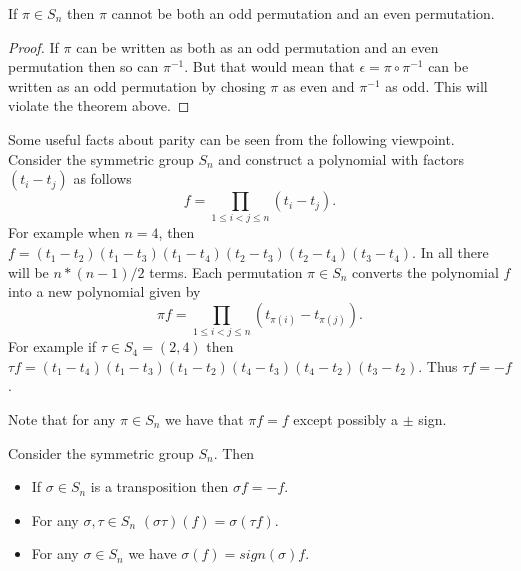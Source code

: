 \begin{Theorem}
    If $\pi \in S_n$ then $\pi$ cannot be both an odd permutation and an even permutation.
\end{Theorem}
\begin{proof}
    If $\pi$ can be written as both as an odd permutation and an even permutation then so can
    $\pi^{-1}$. But that would mean that $\epsilon = \pi \circ \pi ^{-1}$ can be written as an odd
    permutation by chosing $\pi$ as even and $\pi^{-1}$ as odd. This will violate the theorem above.
\end{proof}

Some useful facts about parity can be seen from the following viewpoint. Consider the symmetric
group $S_n$ and construct a polynomial with factors $(t_i - t_j)$ as follows 
\begin{equation*}
    f = \prod_{1 \leq i < j\leq n}(t_i - t_j).
\end{equation*}
For example when $n = 4$, then $f = (t_1-t_2)(t_1-t_3)(t_1-t_4)(t_2-t_3)(t_2 - t_4)(t_3-t_4)$. In
all there will be $n*(n-1)/2$ terms. Each permutation $\pi \in S_n$ converts the polynomial 
$f$ into a new polynomial given by  
\begin{equation*}
    \pi f = \prod_{1 \leq i < j\leq n}(t_{\pi{(i)}} - t_{\pi{(j)}}).
\end{equation*}
For example if $\tau \in S_4 = (2,4)$ then $\tau f = (t_1-t_4)(t_1-t_3)(t_1-t_2)(t_4-t_3)(t_4 -
t_2)(t_3 - t_2)$. Thus $\tau f = -f$.

Note that for any $\pi \in S_n$ we have that $\pi f = f$ except possibly a $\pm$ sign. 
\begin{Lemma}
    Consider the symmetric group $S_n$. Then
    \begin{itemize}
	\item If $\sigma \in S_n$ is a transposition then $\sigma f = -f$.
	\item For any $\sigma,\tau \in S_n$ $(\sigma \tau)(f) = \sigma(\tau f)$.
	\item For any $\sigma \in S_n$ we have $\sigma(f) = sign(\sigma) f$.
    \end{itemize}
\end{Lemma}

